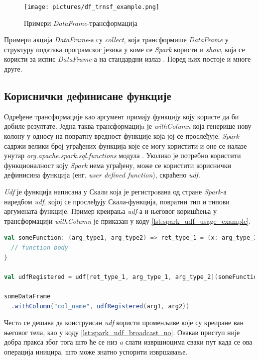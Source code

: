 \documentclass[12pt,oneside]{memoir}
\begin{document}
\begin{figure}[!ht]
  \centering
  \texttt{[image: pictures/df\_trnsf\_example.png]}
  \caption{Примери \textit{DataFrame}-трансформација}
  \label{fig:sprk_df_trnsf_example}
\end{figure}

Примери акција \textit{DataFrame}-а су \textit{collect}, која трансформише \textit{DataFrame} у структуру података програмског језика у коме се \textit{Spark} користи и \textit{show}, која се користи за испис \textit{DataFrame}-а на стандардни излаз \cite{spark_guide}. Поред њих постоје и многе друге.

\subsection{Кориснички дефинисане функције}
\label{subsec:spark_udf_section}

Одређене трансформације као аргумент примају функцију коју користе да би добиле резултате. Једна таква трансформацијa је \textit{withColumn} која генерише нову колону у односу на повратну вредност функције која јој се прослеђује. \textit{Spark} садржи велики број уграђених функција које се могу користити и оне се налазе унутар \textit{org.apache.spark.sql.functions} модула \cite{spark_builtin_func}. Уколико је потребно користити функционалност коју \textit{Spark} нема уграђену, може се користити кориснички дефинисина функција (енг. \textit{user defined function}), скраћено \textit{udf}.

\textit{Udf} је функција написана у Скали која је регистрoвана од стране \textit{Spark}-а наредбом \textit{udf}, којој се прослеђују Скала-функција, повратни тип и типови аргумената функције. Пример креирања \textit{udf}-а и његовог коришћења у трансформацији \textit{withColumn} је приказан у коду \ref{lst:spark_udf_usage_example}.

\begin{lstlisting}[caption={Пример коришћења \textit{udf}-а}, language=Scala, label={lst:spark_udf_usage_example}]
val someFunction: (arg_type1, arg_type2) => ret_type_1 = (x: arg_type_1, y: arg_type_2) => {
  // function body
}

val udfRegistered = udf[ret_type_1, arg_type_1, arg_type_2](someFunction)

someDataFrame
  .withColumn("col_name", udfRegistered(arg1, arg2)) 
\end{lstlisting}

Честo се дешава да конструисан \textit{udf} користи променљиве које су креиране ван његовог тела, као у коду \ref{lst:spark_udf_broadcast_no}. Овакав приступ није добра пракса због тога што ће се низ \textit{a} слати извршиоцима сваки пут када се ова операција иницира, што може знатно успорити извршавање.
\end{document}

